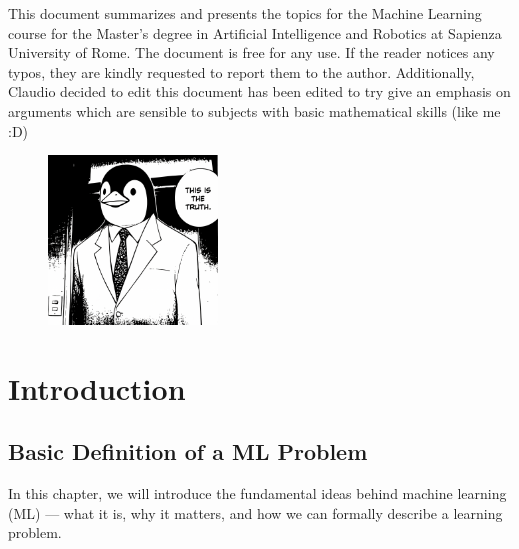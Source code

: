 \documentclass[10pt, letterpaper]{report}
\newcommand{\titolo}{Machine Learning }
\begin{document}
\newpage
\Large
This document summarizes and presents the topics for the
\titolo course for the Master's degree in Artificial Intelligence
and Robotics at Sapienza University of Rome. The document is free for any use.
If the reader notices any typos, they are kindly requested to report them to the author.
Additionally, Claudio decided to edit this document has been edited to try give an emphasis
on arguments which are sensible to subjects with basic mathematical skills (like me :D)
\vfill
\begin{figure}[h!]
	\raggedright
	\includegraphics[width=0.4\textwidth,right ]{images/PenguinTruth.png}
\end{figure}
\newpage %
\normalsize

\tableofcontents
\newpage

\fancyhf{}
\fancyhead[L]{\nouppercase{\leftmark}}
\fancyfoot[C]{\thepage}
\fancyfoot[L]{\titolo}

\newtheorem{definition}{Definition}
\newtheorem{theorem}{Theorem}
\chapter{Introduction}

\section{Basic Definition of a ML Problem}
In this chapter, we will introduce the fundamental ideas behind machine learning (ML) — what it is, why it matters, and how we can formally describe a learning problem.\bigskip
\end{document}
